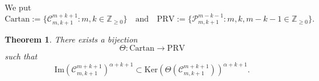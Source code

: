 \documentclass[reqno,11pt]{amsart}
\newtheorem{thm}[equation]{Theorem}
\theoremstyle{remark}
\numberwithin{equation}{section}
\newcommand{\ga}{\alpha}
\newcommand{\Z}{\mathbb{Z}}
\newcommand{\Cal}{\mathcal}
\renewcommand{\Im}{\mathrm{Im}}
\newcommand{\To}{\longrightarrow}
\newcommand{\Ker}{\mathrm{Ker}}
\newcommand{\Cartan}{\mathrm{Cartan}}
\newcommand{\PRV}{\mathrm{PRV}}
\begin{document}
We put
\begin{equation*}
\text{Cartan}:=\{\Cal{C}^{m+k+1}_{m,k+1}: m, k \in \Z_{\geq 0}\}
\quad
\text{and}
\quad
\text{PRV}:=\{\Cal{P}^{m-k-1}_{m,k+1}: m, k, m-k-1 \in \Z_{\geq 0}\}.
\end{equation*}

\begin{thm}\label{thm:CPRV}
There exists a bijection
\begin{equation*}
\Theta\colon \Cartan \To \PRV
\end{equation*}
such that
\begin{equation*}
\Im\left(\Cal{C}^{m+k+1}_{m,k+1}\right)^{\ga+k+1} 
\subset 
\Ker\left(\Theta(\Cal{C}^{m+k+1}_{m,k+1})\right)^{\ga+k+1}.
\end{equation*}
\end{thm}
\end{document}
